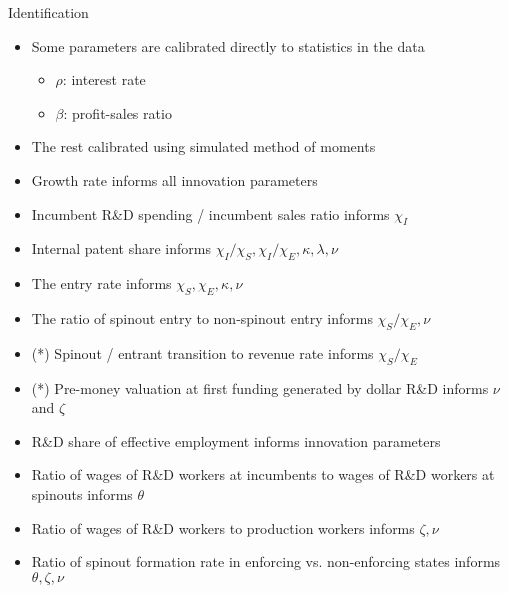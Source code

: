 \documentclass[english,usenames,dvipsnames]{beamer}
\begin{document}
\begin{frame}{Identification}
\begin{itemize}
	\item Some parameters are calibrated directly to statistics in the data
	\begin{itemize}
		\item $\rho$: interest rate
		\item $\beta$: profit-sales ratio
	\end{itemize}
	\footnotesize
	\item The rest calibrated using simulated method of moments
	\item Growth rate informs all innovation parameters
	\item Incumbent R\&D spending / incumbent sales ratio informs $\chi_I$
	\item Internal patent share informs $\chi_I / \chi_S, \chi_I / \chi_E, \kappa, \lambda, \nu$
	\item The entry rate informs $\chi_S,\chi_E,\kappa,\nu$
	\item The ratio of spinout entry to non-spinout entry informs $\chi_S / \chi_E, \nu$
	\item (*) Spinout / entrant transition to revenue rate informs $\chi_S / \chi_E$
	\item (*) Pre-money valuation at first funding generated by dollar R\&D informs $\nu$ and $\zeta$ 
	\item R\&D share of effective employment informs innovation parameters
	\item Ratio of wages of R\&D workers at incumbents to wages of R\&D workers at spinouts informs $\theta$
	\item Ratio of wages of R\&D workers to production workers informs $\zeta , \nu$ 
	\item Ratio of spinout formation rate in enforcing vs. non-enforcing states informs $\theta,\zeta,\nu$ 
\end{itemize}
\end{frame}
\end{document}
